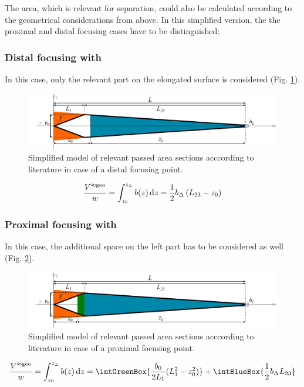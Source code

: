 The area, which is relevant for separation, could also be calculated according to the geometrical considerations from 
above.
In this simplified version, the the proximal and distal focusing cases have to be distinguished:
\subsubsection*{Distal focusing with }
In this case, only the relevant part on the elongated surface is considered (Fig. \ref{fig:fffApprox1}).
\begin{figure}[h]
  \begin{center}
    \includegraphics[width=\linewidth]{./images/fffApprox1.pdf}
    \vspace*{-3ex}    
  \end{center}
  \caption[Passed area section - distal focussing, simplified approximation]{
   Simplified model of relevant passed area sections acccording to literature  in case of a distal 
   focusing 
   point. }
  \label{fig:fffApprox1} 
\end{figure}
\begin{equation}
\frac{V^{\approx\text{geo}}}{w} = 
 \int_{z_0}^{z_L} b(z) \mathop{}\!\mathrm{d} z = 
\frac{1}{2}
b_\Delta
\left( L_{23} - z_0 \right) 
\end{equation}
\clearpage
\subsubsection*{Proximal focusing with }
In this case, the additional space on the left part has to be considered as well (Fig. \ref{fig:fffApprox2}).
\begin{figure}[H]
  \begin{center}
    \includegraphics[width=\linewidth]{./images/fffApprox2.pdf}
    \vspace*{-3ex}    
  \end{center}
  \caption[Passed area section - distal focussing, simplified approximation]{
    Simplified model of relevant passed area sections acccording to literature 
   in case of a proximal focusing 
    point.}
  \label{fig:fffApprox2}
\end{figure}

\begin{equation}
\frac{\Vappgeo}{w} = 
 \int_{z_0}^{\zL} b(z) \diff z = 
\intGreenBox{ \ensuremath {\frac{b_0}{2 L_1}  (L_1^2-z_0^2) }}
+ \intBlueBox{ \ensuremath { \frac{1}{2} 
    \bDelta
      L_{23} } }
\end{equation}

